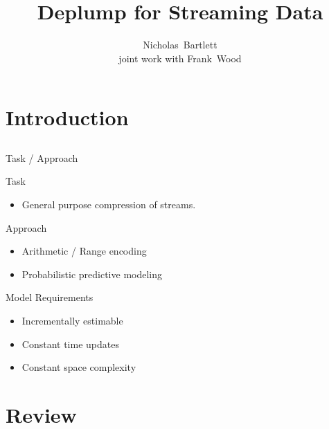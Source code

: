 \documentclass{beamer}
\title[Deplump for Streaming Data] 
{
	Deplump for Streaming Data
}
\author[Bartlett]
{
  Nicholas~Bartlett \\ {\tiny joint work with Frank~Wood } %
}
\institute[Columbia University]
{
  Columbia University
}
\begin{document}
\begin{frame}
	\titlepage
\end{frame}

\section{Introduction}
\subsection{}

\begin{frame}[t]{Task / Approach}
	\begin{block}{Task}
		\begin{itemize}
			\item General purpose compression of streams.
		\end{itemize}
	\end{block}
	
	\begin{block}{Approach}
		\begin{itemize}
			\item Arithmetic / Range encoding
			\item Probabilistic predictive modeling
		\end{itemize}
	\end{block}
	
	\begin{block}{Model Requirements}
		\begin{itemize}
			\item Incrementally estimable
			\item Constant time updates
			\item Constant space complexity
		\end{itemize}
	\end{block}
\end{frame}

\section{Review}
\subsection{}
\end{document}
